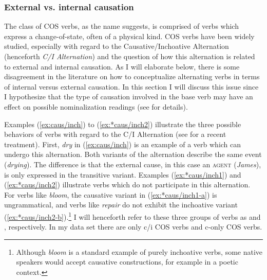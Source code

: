 \subsubsection{External vs. internal causation}
\label{sec:cos-prev-extVSint}

The class of COS verbs, as the name suggests, is comprised of verbs which express a change-of-state, often of a physical kind. COS verbs have been widely studied, especially with regard to the Causative/Inchoative Alternation (henceforth \textit{C/I Alternation}) and the question of how this alternation is related to external and internal causation. As I will elaborate below, there is some disagreement in the literature on how to conceptualize alternating verbs in terms of internal versus external causation. 
In this section I will discuss this issue since I hypothesize that the type of causation involved in the base verb may have an effect on possible nominalization readings (see  for details).

Examples (\ref{ex:caus/inch}) to (\ref{ex:*caus/inch2}) illustrate the three possible behaviors of verbs with regard to the C/I Alternation (see \citealt{Alexiadou.2015} for a recent treatment). 
First, \textit{dry} in (\ref{ex:caus/inch}) is an example of a verb which can undergo this alternation. 
Both variants of the alternation describe the same event (\textit{drying}). The difference is that the external cause, in this case an \textsc{agent} (\textit{James}), is only expressed in the transitive variant. Examples (\ref{ex:*caus/inch1}) and (\ref{ex:*caus/inch2}) illustrate verbs which do not participate in this alternation. For verbs like \textit{bloom}, the causative variant in (\ref{ex:*caus/inch1-a}) is ungrammatical, and verbs like \textit{repair} do not exhibit the inchoative variant (\ref{ex:*caus/inch2-b}).\footnote{Although \textit{bloom} is a standard example of purely inchoative verbs, some native speakers would accept causative constructions, for example in a poetic context.} I will henceforth refer to these three groups of verbs as  and , respectively. In my data set there are only c/i COS verbs and c-only COS verbs.  

\begin{exe}
  \singlespacing
  \ex \label{ex:caus/inch} 
  \begin{xlist}
  \end{xlist}
  \ex \label{ex:*caus/inch1} 
  \begin{xlist}
  \end{xlist}  
  \ex \label{ex:*caus/inch2} 
  \begin{xlist}
  \end{xlist}   
\end{exe}

